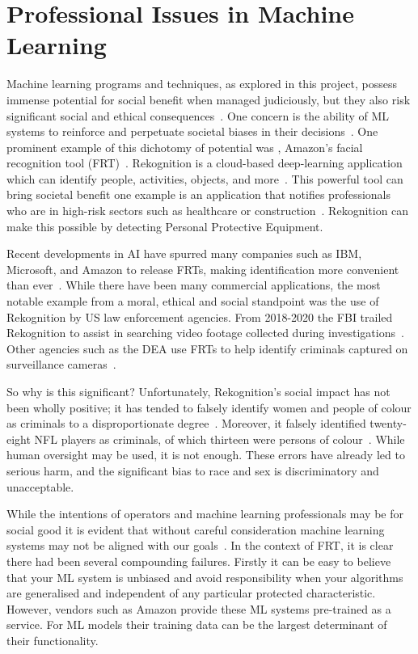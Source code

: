 \documentclass[]{final_report}
\begin{document}
\chapter{Professional Issues in Machine Learning}
\label{chap:professional-issues}

Machine learning programs and techniques, as explored in this project, possess immense potential for social benefit when managed judiciously, but they also risk significant social and ethical consequences~\cite{AISocialImpactAndAccountability}. One concern is the ability of ML systems to reinforce and perpetuate societal biases in their decisions~\cite{AISocialImpactAndAccountability}. One prominent example of this dichotomy of potential was , Amazon's facial recognition tool (FRT)~\cite{legislatingOG}. Rekognition is a cloud-based deep-learning application which can identify people, activities, objects, and more~\cite{rekognitionOverview}. This powerful tool can bring societal benefit one example is an application that notifies professionals who are in high-risk sectors such as healthcare or construction~\cite{rekognitionOverview}. Rekognition can make this possible by detecting Personal Protective Equipment. 

Recent developments in AI have spurred many companies such as IBM, Microsoft, and Amazon to release FRTs, making identification more convenient than ever~\cite{facialRecognitionEthicsSurvay}. While there have been many commercial applications, the most notable example from a moral, ethical and social standpoint was the use of Rekognition by US law enforcement agencies. From 2018-2020 the FBI trailed Rekognition to assist in searching video footage collected during investigations~\cite{facialRecognitionBias}. Other agencies such as the DEA use FRTs to help identify criminals captured on surveillance cameras~\cite{facialRecognitionBias}. 

So why is this significant? Unfortunately, Rekognition's social impact has not been wholly positive; it has tended to falsely identify women and people of colour as criminals to a disproportionate degree~\cite{legislatingRekognition}. Moreover, it falsely identified twenty-eight NFL players as
criminals, of which thirteen were persons of colour~\cite{facialRecognitionBias}. While human oversight may be used, it is not enough. These errors have already led to serious harm, and the significant bias to race and sex is discriminatory and unacceptable.

While the intentions of operators and machine learning professionals may be for social good it is evident that without careful consideration machine learning systems may not be aligned with our goals~\cite{AIAllignemnt}. In the context of FRT, it is clear there had been several compounding failures. Firstly it can be easy to believe that your ML system is unbiased and avoid responsibility when your algorithms are generalised and independent of any particular protected characteristic. However, vendors such as Amazon provide these ML systems pre-trained as a service. For ML models their training data can be the largest determinant of their functionality. 
\end{document}
